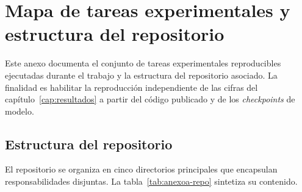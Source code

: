 
\chapter{Mapa de tareas experimentales y estructura del repositorio}
\label{anexo:tareas}
\label{cap:anexoa}

Este anexo documenta el conjunto de tareas experimentales
reproducibles ejecutadas durante el trabajo y la estructura del
repositorio asociado. La finalidad es habilitar la reproducción
independiente de las cifras del capítulo~\ref{cap:resultados} a
partir del código publicado y de los \emph{checkpoints} de modelo.

\section{Estructura del repositorio}
\label{sec:anexoa-repo}

El repositorio se organiza en cinco directorios principales que
encapsulan responsabilidades disjuntas. La
tabla~\ref{tab:anexoa-repo} sintetiza su contenido.

